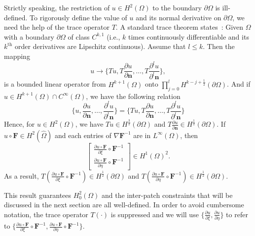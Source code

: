 \begin{remark}
  Strictly speaking, the restriction of $u\in{}H^2(\Omega)$ to the boundary $\partial\Omega$ is ill-defined. To rigorously define the value of $u$ and its normal derivative on $\partial\Omega$, we need the help of the trace operator $T$. A standard trace theorem states~\cite{grisvard2011elliptic}: Given $\Omega$ with a boundary $\partial \Omega$ of class $C^{k,1}$ (i.e., $k$ times continuously differentiable and its $k^\text{th}$ order derivatives are Lipschitz continuous). Assume that $l\leq k$. Then the mapping
  \begin{equation}
    u \rightarrow \{Tu, T\frac{\partial u}{\partial \mathbf{n}}, \dots, T\frac{\partial^l u}{\partial^l \mathbf{n}}\},
  \end{equation}
  is a bounded linear operator from $H^{k+1}(\Omega)$ onto $\prod_{j=0}^lH^{k-j+\frac{1}{2}}(\partial \Omega)$. And if $u\in{}H^{k+1}(\Omega)\cap{}C^\infty(\Omega)$, we have the following relation
  \begin{equation}
    \{u, \frac{\partial u}{\partial \mathbf{n}}, \dots, \frac{\partial^l u}{\partial^l \mathbf{n}}\} =
    \{Tu, T\frac{\partial u}{\partial \mathbf{n}}, \dots, T\frac{\partial^l u}{\partial^l \mathbf{n}}\}
  \end{equation}
  Hence, for $u\in{}H^2(\Omega)$, we have $Tu\in H^{\frac{3}{2}}(\partial \Omega)$ and $T\frac{\partial u}{\partial \mathbf{n}}\in H^{\frac{1}{2}}(\partial \Omega)$. If $u\circ \mathbf{F} \in H^2({\hat{\Omega}})$ and each entries of $\nabla \mathbf{F}^{-1}$ are in $L^{\infty}(\Omega)$, then~\cite{ciarlet1972interpolation}
  \begin{equation}
    \begin{bmatrix}
      \frac{\partial u\circ \mathbf{F}}{\partial \xi} \circ \mathbf{F}^{-1} \\
      \frac{\partial u\circ \mathbf{F}}{\partial \eta} \circ \mathbf{F}^{-1}
    \end{bmatrix}
    \in H^{1}(\Omega)^2.
  \end{equation}
  As a result, $T\left(\frac{\partial u\circ \mathbf{F}}{\partial \xi} \circ \mathbf{F}^{-1}\right)\in H^{\frac{1}{2}}(\partial \Omega)$ and $T\left(\frac{\partial u\circ \mathbf{F}}{\partial \eta} \circ \mathbf{F}^{-1}\right)\in H^{\frac{1}{2}}(\partial \Omega)$.\par
  This result guarantees $H^2_0(\Omega)$ and the inter-patch constraints that will be discussed in the next section are all well-defined. In order to avoid cumbersome notation, the trace operator $T(\cdot)$ is suppressed and we will use $\{ \frac{\partial u}{\partial \xi}, \frac{\partial u}{\partial \eta} \}$ to refer to $\{ \frac{\partial u\circ \mathbf{F}}{\partial \xi} \circ \mathbf{F}^{-1},\frac{\partial u\circ \mathbf{F}}{\partial \eta} \circ \mathbf{F}^{-1} \}$.
\end{remark}

